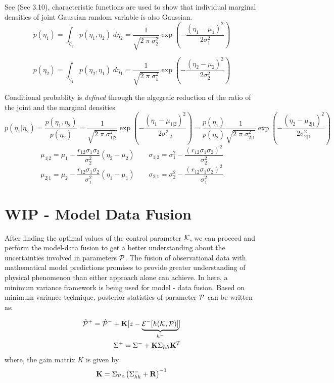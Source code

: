 \documentclass{article}         %
\theoremstyle{definition}
\theoremstyle{remark}
\begin{document}
See \cite{maybeck1979stochastic} (Sec 3.10), characteristic functions 
are used to show that individual marginal
densities of joint  Gaussian random variable is also Gaussian.
\[
p(\eta_1) = 
\int_{\eta_2}
      p(\eta_1,\eta_2)
\;d\eta_2
 = \frac{1}{ \sqrt{2 \; \pi \; \sigma_2^2}} \exp\left( - \frac{(\eta_1 -
\mu_1)^2}{2 \sigma_1^2} \right)
\]

\[
p(\eta_2) = 
\int_{\eta_1}
      p(\eta_2,\eta_1)
\;d\eta_1
 = \frac{1}{ \sqrt{2 \; \pi \; \sigma_1^2}} \exp\left( - \frac{(\eta_2 -
\mu_2)^2}{2 \sigma_2^2} \right)
\]

Conditional probablity is \textit{defined} through the algegraic
reduction of the ratio of the joint and the marginal densities
\[
p(\eta_1|\eta_2) =  \frac{p(\eta_1,\eta_2)  }{p(\eta_2) }
 = \frac{1}{ \sqrt{2 \; \pi \; \sigma_{1|2}^2}}
    \exp\left( - \frac{(\eta_1 - \mu_{1|2})^2}{2 \sigma_{1|2}^2} \right)
 = 
\frac{p(\eta_1)}{p(\eta_2)}
   \frac{1}{ \sqrt{2 \; \pi \; \sigma_{2|1}^2}}
    \exp\left( - \frac{(\eta_2 - \mu_{2|1})^2}{2 \sigma_{2|1}^2} \right)
\]
\[
\mu_{1|2} =  \mu_1 - 
       \frac{r_{12} \sigma_1 \sigma_2 }{\sigma_2^2}
       (\eta_2 - \mu_2)
\qquad
\sigma_{1|2} = 
\sigma_1^2  - 
       \frac{(r_{12} \sigma_1 \sigma_2 )^2}{\sigma_2^2}
\]
\[
\mu_{2|1} =  \mu_2 - 
       \frac{r_{12} \sigma_1 \sigma_2 }{\sigma_1^2}
       (\eta_1 - \mu_1)
\qquad
\sigma_{2|1} = 
\sigma_2^2  - 
       \frac{(r_{12} \sigma_1 \sigma_2 )^2}{\sigma_1^2}
\]

\section{WIP - Model Data Fusion}\label{da}
After finding the optimal values of the control parameter $\kk$, we can proceed and perform the model-data fusion to get a better understanding about the uncertainties involved in parameters $\p$.
The fusion of observational data with mathematical model predictions promises to provide greater understanding of physical phenomenon than either approach alone can achieve. In here, a minimum variance framework is being used for model - data fusion. Based on minimum variance technique, posterior statistics of parameter $\p$ can be written as:

\begin{eqnarray}
\hat{\p}^+=\hat{\p}^-+\K[z-\underbrace{\Ex{h(\kk,\p)}{-}}_{h^-}]\label{minvarmean}\\
\Sigma^+=\Sigma^-+\K\Sigma_{hh}\K^T\label{minvarvar}
\end{eqnarray}
where, %
the gain matrix $K$ is given by
\begin{eqnarray}\label{kgain}
\K=\Sigma_{\p z}\left(\Sigma_{hh}^-+\R\right)^{-1}
\end{eqnarray}
\end{document}
